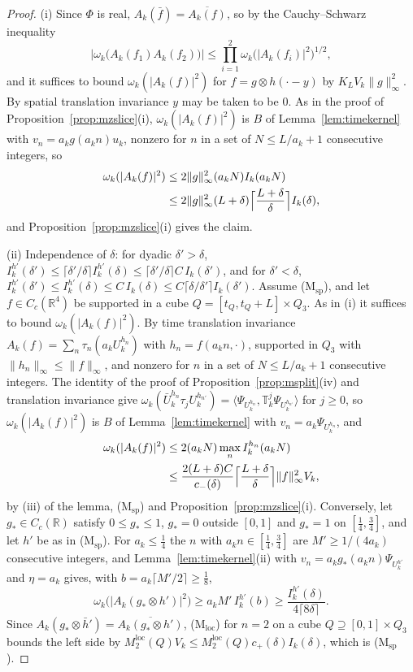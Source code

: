 \documentclass[aps,prd,twocolumn,superscriptaddress,nofootinbib,longbibliography,floatfix,amsmath,amssymb,10pt]{revtex4-2}
\theoremstyle{definition}
\theoremstyle{remark}
\newcommand{\R}{\mathbb{R}}
\newcommand{\ip}[2]{\langle #1,#2\rangle}
\begin{document}
\begin{proof}
(i) Since $\Phi$ is real, $A_k(\bar f)=\overline{A_k(f)}$, so by the
Cauchy--Schwarz inequality
\[
\bigl|\omega_k\bigl(A_k(f_1)A_k(f_2)\bigr)\bigr|\le\prod_{i=1}^2
\omega_k\bigl(|A_k(f_i)|^2\bigr)^{1/2},
\]
and it suffices to bound $\omega_k(|A_k(f)|^2)$ for $f=g\otimes h(\cdot-y)$
by $K_LV_k\|g\|_\infty^2$. By spatial translation invariance $y$ may be
taken to be $0$. As in the proof of Proposition~\ref{prop:mzslice}(i),
$\omega_k(|A_k(f)|^2)$ is $B$ of Lemma~\ref{lem:timekernel} with
$v_n=a_kg(a_kn)u_k$, nonzero for $n$ in a set of $N\le L/a_k+1$ consecutive
integers, so
\[
\begin{split}
\omega_k(|A_k(f)|^2)&\le2\|g\|_\infty^2(a_kN)I_k(a_kN)\\
&\le2\|g\|_\infty^2(L+\delta)\Bigl\lceil\frac{L+\delta}\delta\Bigr\rceil
I_k(\delta),
\end{split}
\]
and Proposition~\ref{prop:mzslice}(i) gives the claim.

(ii) Independence of $\delta$: for dyadic $\delta'>\delta$,
$I^{h'}_k(\delta')\le\lceil\delta'/\delta\rceil I^{h'}_k(\delta)\le
\lceil\delta'/\delta\rceil C\,I_k(\delta')$, and for $\delta'<\delta$,
$I^{h'}_k(\delta')\le I^{h'}_k(\delta)\le C\,I_k(\delta)\le C\lceil\delta/
\delta'\rceil I_k(\delta')$.
Assume (M$_{\mathrm{sp}}$), and let $f\in C_c(\R^4)$ be supported in a cube
$Q=[t_Q,t_Q+L]\times Q_3$. As in (i) it suffices to bound
$\omega_k(|A_k(f)|^2)$. By time translation invariance $A_k(f)=\sum_n\tau_n
(a_kU^{h_n}_k)$ with $h_n=f(a_kn,\cdot)$, supported in $Q_3$ with
$\|h_n\|_\infty\le\|f\|_\infty$, and nonzero for $n$ in a set of $N\le
L/a_k+1$ consecutive integers. The identity of the proof of
Proposition~\ref{prop:msplit}(iv) and translation invariance give
$\omega_k(\bar U^{h_n}_k\tau_jU^{h_{n'}}_k)=\ip{\Psi_{U^{h_n}_k}}{\mathbb
T_k^j\Psi_{U^{h_{n'}}_k}}$ for $j\ge0$, so $\omega_k(|A_k(f)|^2)$ is $B$ of
Lemma~\ref{lem:timekernel} with $v_n=a_k\Psi_{U^{h_n}_k}$, and
\[
\begin{split}
\omega_k(|A_k(f)|^2)&\le2(a_kN)\max_nI^{h_n}_k(a_kN)\\
&\le\frac{2(L+\delta)C}{c_-(\delta)}\Bigl\lceil\frac{L+\delta}\delta
\Bigr\rceil\|f\|_\infty^2V_k ,
\end{split}
\]
by (iii) of the lemma, (M$_{\mathrm{sp}}$) and
Proposition~\ref{prop:mzslice}(i). Conversely, let $g_*\in C_c(\R)$ satisfy
$0\le g_*\le1$, $g_*=0$ outside $[0,1]$ and $g_*=1$ on $[\frac14,\frac34]$,
and let $h'$ be as in (M$_{\mathrm{sp}}$). For $a_k\le\frac14$ the $n$ with
$a_kn\in[\frac14,\frac34]$ are $M'\ge1/(4a_k)$ consecutive integers, and
Lemma~\ref{lem:timekernel}(ii) with $v_n=a_kg_*(a_kn)\Psi_{U^{h'}_k}$ and
$\eta=a_k$ gives, with $b=a_k\lceil M'/2\rceil\ge\frac18$,
\[
\omega_k\bigl(|A_k(g_*\otimes h')|^2\bigr)\ge a_kM'\,I^{h'}_k(b)\ge
\frac{I^{h'}_k(\delta)}{4\lceil8\delta\rceil} .
\]
Since $A_k(g_*\otimes\bar h')=\overline{A_k(g_*\otimes h')}$,
(M$_{\mathrm{loc}}$) for $n=2$ on a cube $Q\supseteq[0,1]\times Q_3$ bounds
the left side by $M^{\mathrm{loc}}_2(Q)V_k\le M^{\mathrm{loc}}_2(Q)c_+(\delta)
I_k(\delta)$, which is (M$_{\mathrm{sp}}$).


\end{proof}
\end{document}
